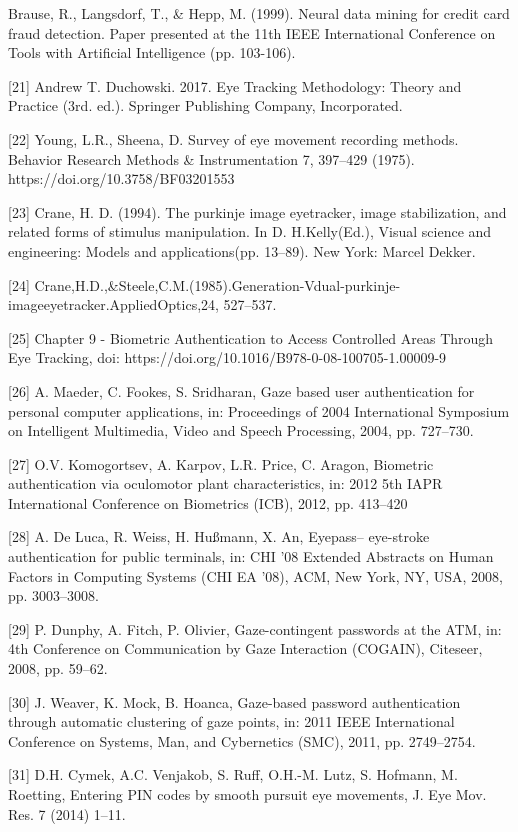 \documentclass{article}
\begin{document}
\begin{raggedright}
[20]  Brause, R., Langsdorf, T., \& Hepp, M. (1999). Neural data mining for credit card fraud detection. Paper presented at the 11th IEEE International Conference on Tools with Artificial Intelligence (pp. 103-106).

[21] Andrew T. Duchowski. 2017. Eye Tracking Methodology: Theory and Practice (3rd. ed.). Springer Publishing Company, Incorporated.

[22] Young, L.R., Sheena, D. Survey of eye movement recording methods. Behavior Research Methods \& Instrumentation 7, 397–429 (1975). https://doi.org/10.3758/BF03201553

[23] Crane, H. D. (1994). The purkinje image eyetracker, image stabilization, and related forms of stimulus manipulation. In D. H.Kelly(Ed.), Visual science and engineering: Models and applications(pp. 13–89). New York: Marcel Dekker.

[24] Crane,H.D.,\&Steele,C.M.(1985).Generation-Vdual-purkinje-imageeyetracker.AppliedOptics,24, 527–537.

[25] Chapter 9 - Biometric Authentication to Access Controlled Areas Through Eye Tracking, doi: https://doi.org/10.1016/B978-0-08-100705-1.00009-9

[26] A. Maeder, C. Fookes, S. Sridharan, Gaze based user authentication for personal computer applications, in: Proceedings of 2004 International Symposium on Intelligent Multimedia, Video and Speech Processing, 2004, pp. 727–730.

[27] O.V. Komogortsev, A. Karpov, L.R. Price, C. Aragon, Biometric authentication via oculomotor plant characteristics, in: 2012 5th IAPR International Conference on Biometrics (ICB), 2012, pp. 413–420

[28] A. De Luca, R. Weiss, H. Hußmann, X. An, Eyepass– eye-stroke authentication for public terminals, in: CHI '08 Extended Abstracts on Human Factors in Computing Systems (CHI EA '08), ACM, New York, NY, USA, 2008, pp. 3003–3008.

[29] P. Dunphy, A. Fitch, P. Olivier, Gaze-contingent passwords at the ATM, in: 4th Conference on Communication by Gaze Interaction (COGAIN), Citeseer, 2008, pp. 59–62.

[30] J. Weaver, K. Mock, B. Hoanca, Gaze-based password authentication through automatic clustering of gaze points, in: 2011 IEEE International Conference on Systems, Man, and Cybernetics (SMC), 2011, pp. 2749–2754.

[31] D.H. Cymek, A.C. Venjakob, S. Ruff, O.H.-M. Lutz, S. Hofmann, M. Roetting, Entering PIN codes by smooth pursuit eye movements, J. Eye Mov. Res. 7 (2014) 1–11.


\end{raggedright}
\end{document}
